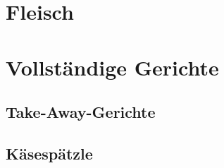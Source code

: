 \documentclass[a4paper, 12pt]{scrbook} 								%
\numberwithin{equation}{section} 									%
\begin{document}
	

	


\chapter{Fleisch}


\chapter{Vollständige Gerichte}
\newpage

	\section{Take-Away-Gerichte}
	\newpage

	\section{Käsespätzle}

	\noindent
\end{document}
